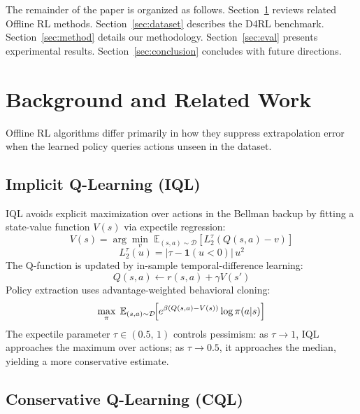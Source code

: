 \documentclass[conference]{IEEEtran}
\begin{document}
The remainder of the paper is organized as follows.
Section~\ref{sec:related} reviews related Offline RL methods.
Section~\ref{sec:dataset} describes the D4RL benchmark.
Section~\ref{sec:method} details our methodology.
Section~\ref{sec:eval} presents experimental results.
Section~\ref{sec:conclusion} concludes with future directions.

\section{Background and Related Work}
\label{sec:related}

Offline RL algorithms differ primarily in how they suppress extrapolation error
when the learned policy queries actions unseen in the dataset.

\subsection{Implicit Q-Learning (IQL)}

IQL \cite{kostrikov2022iql} avoids explicit maximization over actions in the
Bellman backup by fitting a state-value function $V(s)$ via expectile
regression:
\begin{equation}
  V(s) = \arg\min_v\;
  \mathbb{E}_{(s,a)\sim\mathcal{D}}\!\left[L_2^\tau\!\left(Q(s,a)-v\right)\right]
  \label{eq:iql-v}
\end{equation}
\begin{equation}
  L_2^\tau(u) = \bigl|\tau - \mathbf{1}(u<0)\bigr|\,u^2
  \label{eq:expectile-loss}
\end{equation}
The Q-function is updated by in-sample temporal-difference learning:
\begin{equation}
  Q(s,a) \leftarrow r(s,a) + \gamma V(s')
  \label{eq:iql-q}
\end{equation}
Policy extraction uses advantage-weighted behavioral cloning:
\begin{equation}
  \max_\pi\;
  \mathbb{E}_{(s,a)\sim\mathcal{D}}\!\Bigl[
    e^{\beta(Q(s,a)-V(s))} \log\pi(a|s)
  \Bigr]
  \label{eq:iql-policy}
\end{equation}
The expectile parameter $\tau \in (0.5,\,1)$ controls pessimism: as
$\tau \to 1$, IQL approaches the maximum over actions; as $\tau \to 0.5$,
it approaches the median, yielding a more conservative estimate.

\subsection{Conservative Q-Learning (CQL)}
\end{document}
